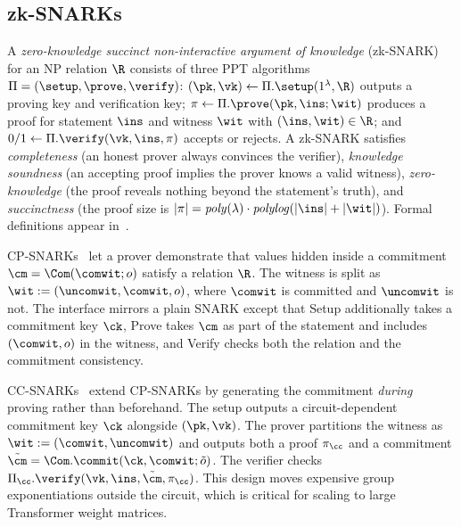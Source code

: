 \documentclass[runningheads]{llncs}
\begin{document}
\subsection{zk-SNARKs}
A \textit{zero-knowledge succinct non-interactive argument of knowledge} (zk-SNARK) for an NP relation $\R$ consists of three PPT algorithms $\Pi=(\setup,\prove,\verify)$: $(\pk,\vk)\gets\Pi.\setup(1^\lambda,\R)$ outputs a proving key and verification key; $\pi\gets\Pi.\prove(\pk,\ins;\wit)$ produces a proof for statement $\ins$ and witness $\wit$ with $(\ins,\wit)\in\R$; and $0/1\gets\Pi.\verify(\vk,\ins,\pi)$ accepts or rejects. A zk-SNARK satisfies \emph{completeness} (an honest prover always convinces the verifier), \emph{knowledge soundness} (an accepting proof implies the prover knows a valid witness), \emph{zero-knowledge} (the proof reveals nothing beyond the statement's truth), and \emph{succinctness} (the proof size is $|\pi|=\mathit{poly}(\lambda)\cdot\mathit{polylog}(|\ins|+|\wit|)$). Formal definitions appear in~\cite{Groth16}.

CP-SNARKs~\cite{Legosnark,Lunar} let a prover demonstrate that values hidden inside a commitment $\cm=\Com(\comwit;o)$ satisfy a relation $\R$. The witness is split as $\wit:=(\uncomwit,\comwit,o)$, where $\comwit$ is committed and $\uncomwit$ is not. The interface mirrors a plain SNARK except that Setup additionally takes a commitment key $\ck$, Prove takes $\cm$ as part of the statement and includes $(\comwit,o)$ in the witness, and Verify checks both the relation and the commitment consistency.

CC-SNARKs~\cite{Legosnark,Vectis} extend CP-SNARKs by generating the commitment \emph{during} proving rather than beforehand. The setup outputs a circuit-dependent commitment key $\ck$ alongside $(\pk,\vk)$. The prover partitions the witness as $\wit:=(\comwit,\uncomwit)$ and outputs both a proof $\pi_\cc$ and a commitment $\tilde{\cm}=\Com.\commit(\ck,\comwit;\tilde{o})$. The verifier checks $\Pi_\cc.\verify(\vk,\ins,\tilde{\cm},\pi_\cc)$. This design moves expensive group exponentiations outside the circuit, which is critical for scaling to large Transformer weight matrices.
\end{document}
